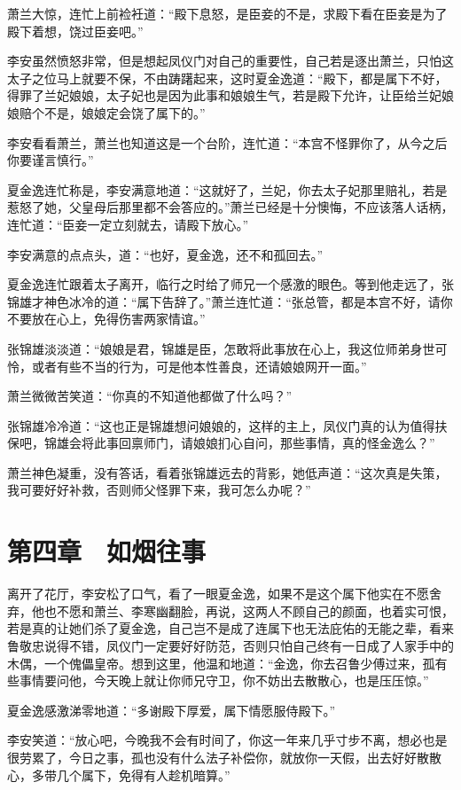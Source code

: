 萧兰大惊，连忙上前裣衽道：“殿下息怒，是臣妾的不是，求殿下看在臣妾是为了殿下着想，饶过臣妾吧。”

李安虽然愤怒非常，但是想起凤仪门对自己的重要性，自己若是逐出萧兰，只怕这太子之位马上就要不保，不由踌躇起来，这时夏金逸道：“殿下，都是属下不好，得罪了兰妃娘娘，太子妃也是因为此事和娘娘生气，若是殿下允许，让臣给兰妃娘娘赔个不是，娘娘定会饶了属下的。”

李安看看萧兰，萧兰也知道这是一个台阶，连忙道：“本宫不怪罪你了，从今之后你要谨言慎行。”

夏金逸连忙称是，李安满意地道：“这就好了，兰妃，你去太子妃那里赔礼，若是惹怒了她，父皇母后那里都不会答应的。”萧兰已经是十分懊悔，不应该落人话柄，连忙道：“臣妾一定立刻就去，请殿下放心。”

李安满意的点点头，道：“也好，夏金逸，还不和孤回去。”

夏金逸连忙跟着太子离开，临行之时给了师兄一个感激的眼色。等到他走远了，张锦雄才神色冰冷的道：“属下告辞了。”萧兰连忙道：“张总管，都是本宫不好，请你不要放在心上，免得伤害两家情谊。”

张锦雄淡淡道：“娘娘是君，锦雄是臣，怎敢将此事放在心上，我这位师弟身世可怜，或者有些不当的行为，可是他本性善良，还请娘娘网开一面。”

萧兰微微苦笑道：“你真的不知道他都做了什么吗？”

张锦雄冷冷道：“这也正是锦雄想问娘娘的，这样的主上，凤仪门真的认为值得扶保吧，锦雄会将此事回禀师门，请娘娘扪心自问，那些事情，真的怪金逸么？”

萧兰神色凝重，没有答话，看着张锦雄远去的背影，她低声道：“这次真是失策，我可要好好补救，否则师父怪罪下来，我可怎么办呢？”

\chapter{第四章　如烟往事}

离开了花厅，李安松了口气，看了一眼夏金逸，如果不是这个属下他实在不愿舍弃，他也不愿和萧兰、李寒幽翻脸，再说，这两人不顾自己的颜面，也着实可恨，若是真的让她们杀了夏金逸，自己岂不是成了连属下也无法庇佑的无能之辈，看来鲁敬忠说得不错，凤仪门一定要好好防范，否则只怕自己终有一日成了人家手中的木偶，一个傀儡皇帝。想到这里，他温和地道：“金逸，你去召鲁少傅过来，孤有些事情要问他，今天晚上就让你师兄守卫，你不妨出去散散心，也是压压惊。”

夏金逸感激涕零地道：“多谢殿下厚爱，属下情愿服侍殿下。”

李安笑道：“放心吧，今晚我不会有时间了，你这一年来几乎寸步不离，想必也是很劳累了，今日之事，孤也没有什么法子补偿你，就放你一天假，出去好好散散心，多带几个属下，免得有人趁机暗算。”

